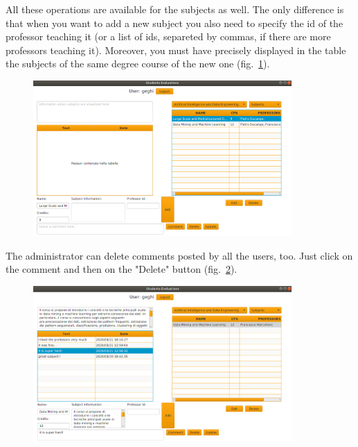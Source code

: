 \documentclass[a4paper]{article}
\begin{document}
All these operations are available for the subjects as well. The only difference is that when you want to add a new subject you also need to specify the id of the professor teaching it (or a list of ids, separeted by commas, if there are more professors teaching it). Moreover, you must have precisely displayed in the table the subjects of the same degree course of the new one (fig.~\ref{fig:admin3}).
\begin{figure}[h]
\centering
\includegraphics[width=0.88\textwidth]{images/screens/admin3}
\label{fig:admin3}
\end{figure}
\clearpage
The administrator can delete comments posted by all the users, too. Just click on the comment and then on the "Delete" button (fig.~\ref{fig:admin4}).
\begin{figure}[h]
\centering
\includegraphics[width=0.88\textwidth]{images/screens/admin4}
\label{fig:admin4}
\end{figure}
\end{document}
